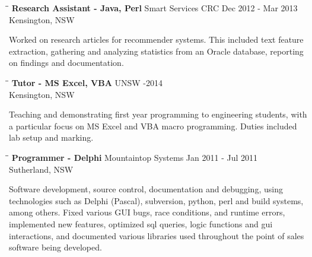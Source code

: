 \documentclass{res}
\begin{document}
\begin{resume}
   \begin{tabbing}
   \hspace{2.3in}\= \hspace{2.6in}\= \kill %
    {\bf Research Assistant - Java, Perl} \>Smart Services CRC \>Dec 2012 - Mar 2013\\
                                          \>Kensington, NSW
   \end{tabbing}\vspace{-20pt}      %
    Worked on research articles for recommender systems. This included text
    feature extraction, gathering and analyzing statistics from an Oracle
    database, reporting on findings and documentation.
   \begin{tabbing}
   \hspace{2.3in}\= \hspace{2.6in}\= \kill %
    {\bf Tutor - MS Excel, VBA} \>UNSW     -2014\\
                                \>Kensington, NSW
   \end{tabbing}\vspace{-20pt}      %
    Teaching and demonstrating first year programming to engineering students,
    with a particular focus on MS Excel and VBA macro programming. Duties
    included lab setup and marking.
   \begin{tabbing}
   \hspace{2.3in}\= \hspace{2.6in}\= \kill %
    {\bf Programmer - Delphi} \>Mountaintop Systems \> Jan 2011 - Jul 2011\\
                              \>Sutherland, NSW
   \end{tabbing}\vspace{-20pt}
    Software development, source control, documentation and debugging,
    using technologies such as Delphi (Pascal), subversion, python, perl and
    build systems, among others. Fixed various GUI bugs, race conditions, and
    runtime errors, implemented new features, optimized sql queries, logic
    functions and gui interactions, and documented various libraries used
    throughout the point of sales software being developed.



\end{resume}
\end{document}
